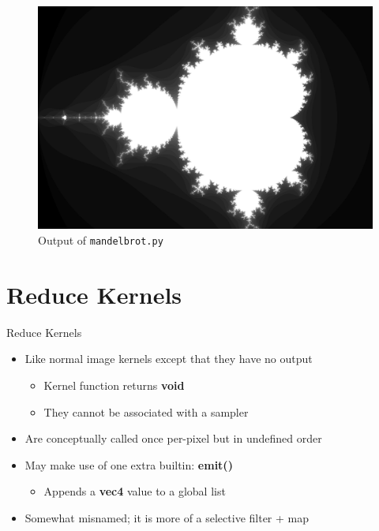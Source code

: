 \documentclass{beamer}
\newcommand{\bi}{\begin{itemize}}
\newcommand{\ei}{\end{itemize}}
\begin{document}
\begin{frame}
\begin{figure}\centering
\includegraphics[width=\textwidth]{examples/mandelbrot} 
\caption{Output of \texttt{mandelbrot.py}}
\end{figure}
\end{frame}


\section{Reduce Kernels} %

\begin{frame}{Reduce Kernels}
  \bi
    \item Like normal image kernels except that they have no output
    \bi
      \item Kernel function returns \textbf{void}
      \item They cannot be associated with a sampler
    \ei
    \item Are conceptually called once per-pixel but in undefined order
    \item May make use of one extra builtin: \textbf{emit()}
    \bi
      \item Appends a \textbf{vec4} value to a global list
    \ei
    \item Somewhat misnamed; it is more of a selective filter + map
  \ei
\end{frame}

\begin{frame}

\end{frame}
\end{document}
